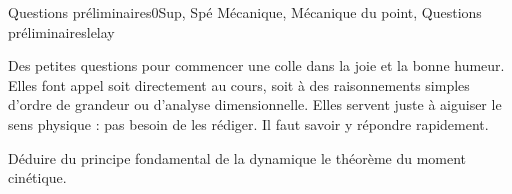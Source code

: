 
\begin{exercise}{Questions préliminaires}{0}{Sup, Spé}
{Mécanique, Mécanique du point, Questions préliminaires}{lelay}

Des petites questions pour commencer une colle dans la joie et la bonne humeur. Elles font appel soit directement au cours, soit à des raisonnements simples d'ordre de grandeur ou d'analyse dimensionnelle. Elles servent juste à aiguiser le sens physique : pas besoin de les rédiger. Il faut savoir y répondre rapidement.

\begin{questions}
    \question Déduire du principe fondamental de la dynamique le théorème du moment cinétique.
\end{questions}
\end{exercise}